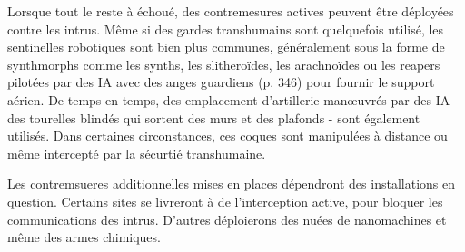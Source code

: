 Lorsque tout le reste à échoué, des contremesures actives peuvent être déployées contre les intrus. Même si des gardes transhumains sont quelquefois utilisé, les sentinelles robotiques sont bien plus communes, généralement sous la forme de synthmorphs comme les synths, les slitheroïdes, les arachnoïdes ou les reapers pilotées par des IA avec des anges guardiens (p. 346) pour fournir le support aérien. De temps en temps, des emplacement d'artillerie manœuvrés par des IA - des tourelles blindés qui sortent des murs et des plafonds - sont également utilisés. Dans certaines circonstances, ces coques sont manipulées à distance ou même intercepté par la sécurtié transhumaine. 

Les contremsueres additionnelles mises en places dépendront des installations en question. Certains sites se livreront à de l'interception active, pour bloquer les communications des intrus. D'autres déploierons des nuées de nanomachines et même des armes chimiques. 
